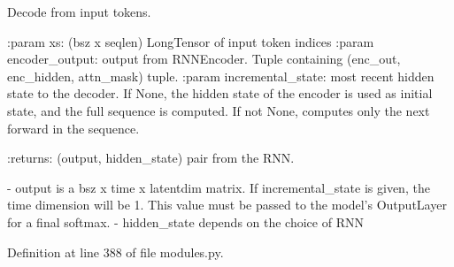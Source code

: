\begin{DoxyVerb}Decode from input tokens.

:param xs: (bsz x seqlen) LongTensor of input token indices
:param encoder_output: output from RNNEncoder. Tuple containing
    (enc_out, enc_hidden, attn_mask) tuple.
:param incremental_state: most recent hidden state to the decoder.
    If None, the hidden state of the encoder is used as initial state,
    and the full sequence is computed. If not None, computes only the
    next forward in the sequence.

:returns: (output, hidden_state) pair from the RNN.

    - output is a bsz x time x latentdim matrix. If incremental_state is
given, the time dimension will be 1. This value must be passed to
the model's OutputLayer for a final softmax.
    - hidden_state depends on the choice of RNN
\end{DoxyVerb}
 

Definition at line 388 of file modules.\+py.


